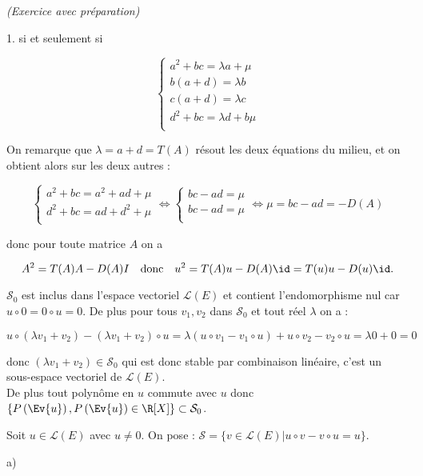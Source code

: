 \documentclass[11pt]{article}%
\begin{document}
\begin{exercice}{\it (Exercice avec préparation)}
\begin{noliste}{1.}
 si et seulement si
 
\[
 \left\{ 
\begin{array}{c}
 a^{2} + bc = \lambda a + \mu \\
b ( a + d ) = \lambda b \\
c ( a + d) = \lambda c \\
d^{2} + bc = \lambda d + b\mu \\
\end{array}
\right. 
\]

 On remarque que $\lambda = a + d = T ( A )$ résout les deux équations
du milieu, et on obtient alors sur les deux autres : 
 
\[
 \left\{ 
\begin{array}{c}
 a^{2} + bc = a^{2} + ad + \mu \\
d^{2} + bc = a d + d^{2} + \mu \\
\end{array}
\right. \Longleftrightarrow \left\{ 
\begin{array}{c}
 bc - ad = \mu \\
bc - a d = \mu \\
\end{array}
\right. \Longleftrightarrow \mu = b c - ad = - D ( A ) 
\]

 donc pour toute matrice $A$ on a 
 
\[
 A^{2} = T(A) A - D ( A ) I \ \ \text{ donc } \ \ u^{2} = T ( A ) u - D
( A ) \id = T (u) u - D ( u ) \id. 
\]

 \item $\mathcal{S}_{0}$ est inclus dans l'espace vectoriel
$\mathcal{L} (E)$ et contient l'endomorphisme nul car $u \circ 0 = 0
\circ u = 0$. De plus pour tous $v_{1}, v_{2}$ dans $\mathcal{S}_{0}$
et tout réel $\lambda$ on a : 
 
\[
 u \circ ( \lambda v_{1} + v_{2} ) - ( \lambda v_{1} + v_{2} ) \circ u
= \lambda ( u \circ v_{1} - v_{1} \circ u ) + u \circ v_{2} - v_{2}
\circ u = \lambda 0 + 0 = 0 
\]

 donc $(\lambda v_{1} + v_{2}) \in \mathcal{S}_{0}$ qui est donc stable
par combinaison linéaire, c'est un sous-espace vectoriel de
$\mathcal{L} (E)$. \\

 De plus tout polynôme en $u$ commute avec $u$ donc $\{
P\left(\Ev{u}\right), P\left(\Ev{u}\right) \in \R [X] \} \subset
\mathcal{S}_{0}$. \\

 \item Soit $u \in \mathcal{L} (E)$ avec $u \neq 0$. On pose :
$\mathcal{S} = \{ v \in \mathcal{L} (E) | u \circ v - v \circ u = u
\}$. \begin{noliste}{a)}
 \setlength{\itemsep}{2mm}


\end{noliste}
\end{noliste}
\end{exercice}
\end{document}
